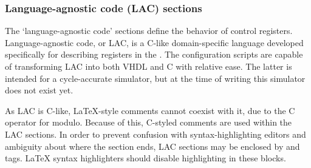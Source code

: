 
\subsubsection{Language-agnostic code (LAC) sections}
\label{sec:core-ug-cfg-cregs-code}

The `language-agnostic code' sections define the behavior of control registers. 
Language-agnostic code, or LAC, is a C-like domain-specific language developed 
specifically for describing registers in the \rvex{}. The configuration scripts 
are capable of transforming LAC into both VHDL and C with relative ease. The 
latter is intended for a cycle-accurate simulator, but at the time of writing 
this simulator does not exist yet.

As LAC is C-like, LaTeX-style comments cannot coexist with it, due to the C 
\codenodetok{\%} operator for modulo. Because of this, C-styled comments are 
used within the LAC sections. In order to prevent confusion with 
syntax-highlighting editors and ambiguity about where the section ends, LAC 
sections may be enclosed by \code{\begin{lstlisting}} and 
\code{\end{lstlisting}} tags. LaTeX syntax highlighters should disable 
highlighting in these blocks.

